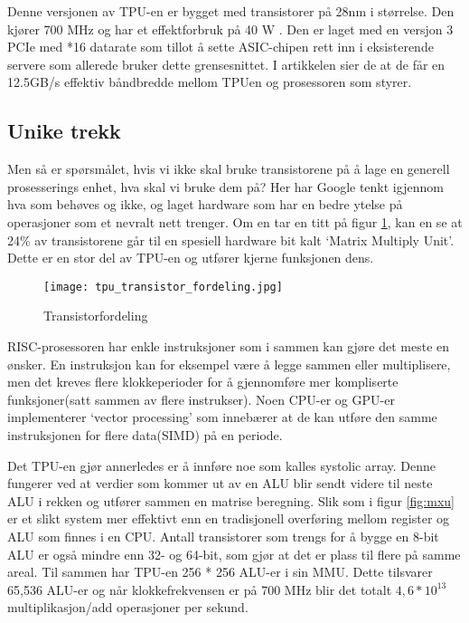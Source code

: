 Denne versjonen av TPU-en er bygget med transistorer på 28nm i størrelse. Den kjører 700 MHz og har et effektforbruk på 40 W \cite{tpu_main}. Den er laget med en versjon 3 PCIe med *16 datarate som tillot å sette ASIC-chipen rett inn i eksisterende servere som allerede bruker dette grensesnittet. I artikkelen sier de at de får en 12.5GB/s effektiv båndbredde mellom TPUen og prosessoren som styrer.
 
\subsection{Unike trekk}
Men så er spørsmålet, hvis vi ikke skal bruke transistorene på å lage en generell prosesserings enhet, hva skal vi bruke dem på? Her har Google tenkt igjennom hva som behøves og ikke, og laget hardware som har en bedre ytelse på operasjoner som et nevralt nett trenger. Om en tar en titt på figur \ref{fig:transistor}, kan en se at 24\% av transistorene går til en spesiell hardware bit kalt ‘Matrix Multiply Unit’. Dette er en stor del av TPU-en og utfører kjerne funksjonen dens.

\begin{figure}[ht]
    \centering
    \texttt{[image: tpu\_transistor\_fordeling.jpg]}
    \caption{Transistorfordeling}
    \label{fig:transistor}
\end{figure}
 
RISC-prosessoren har enkle instruksjoner som i sammen kan gjøre det meste en ønsker. En instruksjon kan for eksempel være å legge sammen eller multiplisere, men det kreves flere klokkeperioder for å gjennomføre mer kompliserte funksjoner(satt sammen av flere instrukser). Noen CPU-er og GPU-er implementerer ‘vector processing’ \cite{look_at_TPU} som innebærer at de kan utføre den samme instruksjonen for flere data(SIMD) på en periode. 

Det TPU-en gjør annerledes er å innføre noe som kalles systolic array. Denne fungerer ved at verdier som kommer ut av en ALU blir sendt videre til neste ALU i rekken og utfører sammen en matrise beregning. Slik som i figur \ref{fig:mxu} er et slikt system mer effektivt enn en tradisjonell overføring mellom register og ALU som finnes i en CPU. Antall transistorer som trengs for å bygge en 8-bit ALU er også mindre enn 32- og 64-bit, som gjør at det er plass til flere på samme areal. Til sammen har TPU-en 256 * 256 ALU-er i sin MMU\cite{look_at_TPU}. Dette tilsvarer 65,536 ALU-er og når klokkefrekvensen er på 700 MHz blir det totalt $4,6 * 10^{13}$ multiplikasjon/add operasjoner per sekund. 

